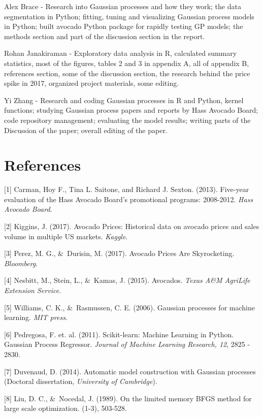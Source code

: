 \documentclass{article}
\begin{document}
    Alex Brace - Research into Gaussian processes and how they work; the data segmentation in Python; fitting, tuning and visualizing Gaussian process models in Python; built avocado Python package for rapidly testing GP models; the methods section and part of the discussion section in the report.
    
    Rohan Janakiraman - Exploratory data analysis in R, calculated summary statistics, most of the figures, tables 2 and 3 in appendix A, all of appendix B, references section, some of the discussion section, the research behind the price spike in 2017, organized project materials, some editing.  
   
    Yi Zhang - Research and coding Gaussian processes in R and Python, kernel functions; studying Gaussian process papers and reports by Hass Avocado Board; code repository management; evaluating the model results; writing parts of the Discussion of the paper; overall editing of the paper.


\section*{References}

\small

[1] Carman, Hoy F., Tina L. Saitone, and Richard J. Sexton. (2013). Five-year evaluation of the Hass Avocado Board’s promotional programs: 2008-2012. \textit{Hass Avocado Board}.

[2] Kiggins, J. (2017). Avocado Prices: Historical data on avocado prices and sales volume in multiple US markets. \textit{Kaggle}.

[3] Perez, M. G., \&\ Durisin, M. (2017). Avocado Prices Are Skyrocketing. \textit{Bloomberg}.

[4] Nesbitt, M., Stein, L., \&\ Kamas, J. (2015). Avocados. \textit{Texas A&M AgriLife Extension Service}.

[5] Williams, C. K., \&\ Rasmussen, C. E. (2006). Gaussian processes for machine learning. \textit{MIT press}.

[6] Pedregosa, F. et. al. (2011). Scikit-learn: Machine Learning in Python. Gaussian Process Regressor. \textit{Journal of Machine Learning Research, 12}, 2825 - 2830. 

[7] Duvenaud, D. (2014). Automatic model construction with Gaussian processes (Doctoral dissertation, \textit{University of Cambridge}).

[8] Liu, D. C., \&\ Nocedal, J. (1989). On the limited memory BFGS method for large scale optimization. (1-3), 503-528.
\end{document}

